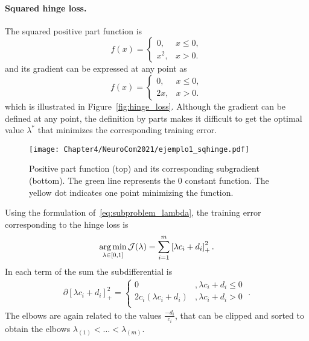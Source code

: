 \paragraph*{Squared hinge loss.\\}
The squared positive part function is
\begin{equation}
    \nonumber
    f(x) = 
    \begin{cases}
    0 ,& x \leq 0, \\
    x^2 ,& x > 0    .
    \end{cases}
\end{equation}
and its gradient can be expressed at any point as
\begin{equation}
    \nonumber
    f(x) = 
    \begin{cases}
    0 ,& x \leq 0, \\
    2x ,& x > 0 .
    \end{cases}
\end{equation}
which is illustrated in Figure~\ref{fig:hinge_loss}.
Although the gradient can be defined at any point, the definition by parts makes it difficult to get the optimal value $\lambda^*$ that minimizes the corresponding training error.
\begin{figure}[t!]
    \centering
    \texttt{[image: Chapter4/NeuroCom2021/ejemplo1\_sqhinge.pdf]}
    \caption{Positive part function (top) and its corresponding subgradient (bottom). The green line represents the $0$ constant function. The yellow dot indicates one point minimizing the function.}
    \label{fig:sqhinge_loss}
\end{figure}
Using the formulation of~\eqref{eq:subproblem_lambda}, the training error corresponding to the hinge loss is
\begin{equation}
    \label{eq:opt_hinge_l2}
    \argmin_{\lambda \in [0, 1]} \mathcal{J}(\lambda) = \sum_{i=1}^{\npertask} \pospart{\lambda c_i + d_i}^2.
\end{equation}
In each term of the sum the subdifferential is 
\begin{align*}
    \partial \left[\lambda c_i + d_i \right]_+^2 = 
    \begin{cases}
        0 &, \lambda c_i + d_i  \leq 0 \\
        2 c_i (\lambda c_i + d_i) &, \lambda c_i + d_i  > 0 \\
    \end{cases} \; .
\end{align*}
The elbows are again related to the values $\frac{-d_i}{c_i}$, that can be clipped and sorted to obtain the elbows ${\lambda}_{(1)} < \ldots < {\lambda}_{(m)}$.
